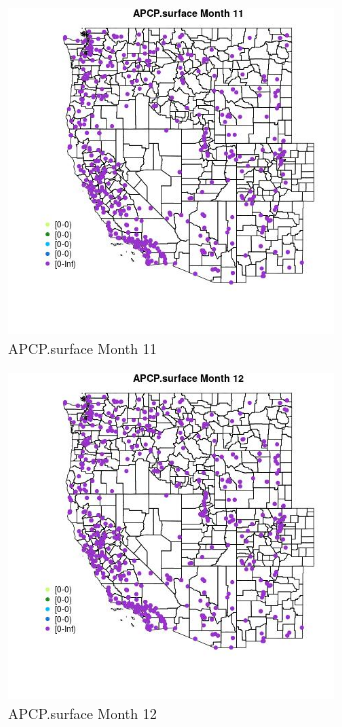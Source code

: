 \begin{figure} 
\centering  
\includegraphics[width=0.77\textwidth]{Code_Outputs/Report_ML_input_PM25_Step4_part_e_de_duplicated_aves_compiled_2019-05-14wNAs_MapObsMo11APCPsurface.jpg} 
\caption{\label{fig:Report_ML_input_PM25_Step4_part_e_de_duplicated_aves_compiled_2019-05-14wNAsMapObsMo11APCPsurface}APCP.surface Month 11} 
\end{figure} 
 

\begin{figure} 
\centering  
\includegraphics[width=0.77\textwidth]{Code_Outputs/Report_ML_input_PM25_Step4_part_e_de_duplicated_aves_compiled_2019-05-14wNAs_MapObsMo12APCPsurface.jpg} 
\caption{\label{fig:Report_ML_input_PM25_Step4_part_e_de_duplicated_aves_compiled_2019-05-14wNAsMapObsMo12APCPsurface}APCP.surface Month 12} 
\end{figure} 
 

